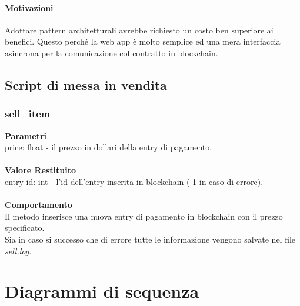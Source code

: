 \documentclass[a4paper, 12pt]{article}
\begin{document}
\paragraph{Motivazioni}
Adottare pattern architetturali avrebbe richiesto un costo ben superiore ai benefici. Questo perché la web app è molto semplice ed una mera interfaccia asincrona per la comunicazione col contratto in blockchain.

\subsection{Script di messa in vendita}
\subsubsection{sell\_item}
\textbf{Parametri}\\
price: float - il prezzo in dollari della entry di pagamento.\\\\
\textbf{Valore Restituito}\\
entry id: int - l'id dell'entry inserita in blockchain (-1 in caso di errore).\\\\
\textbf{Comportamento}\\
Il metodo inserisce una nuova entry di pagamento in blockchain con il prezzo specificato.\\
Sia in caso si successo che di errore tutte le informazione vengono salvate nel file \textit{sell.log}.

\section{Diagrammi di sequenza}
\end{document}
